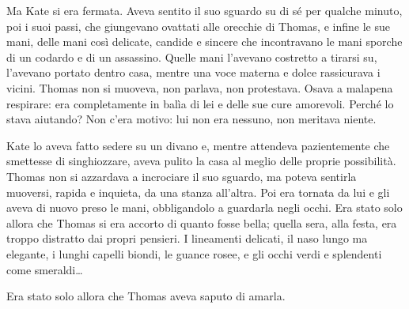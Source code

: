 \documentclass[a4paper,oneside,10pt]{memoir}
\begin{document}
Ma Kate si era fermata. Aveva sentito il suo sguardo su di sé per qualche minuto, poi i suoi passi, che giungevano
ovattati alle orecchie di Thomas, e infine le sue mani, delle mani così delicate, candide e sincere che incontravano
le mani sporche di un codardo e di un assassino. Quelle mani l'avevano costretto a tirarsi su, l'avevano portato dentro
casa, mentre una voce materna e dolce rassicurava i vicini. Thomas non si muoveva, non parlava, non protestava. Osava a
malapena respirare: era completamente in balìa di lei e delle sue cure amorevoli. Perché lo stava aiutando? Non c'era
motivo: lui non era nessuno, non meritava niente.

Kate lo aveva fatto sedere su un divano e, mentre attendeva pazientemente che smettesse di singhiozzare, aveva pulito la
casa al meglio delle proprie possibilità. Thomas non si azzardava a incrociare il suo sguardo, ma poteva sentirla
muoversi, rapida e inquieta, da una stanza all'altra. Poi era tornata da lui e gli aveva di nuovo preso le mani,
obbligandolo a guardarla negli occhi. Era stato solo allora che Thomas si era accorto di quanto fosse bella; quella
sera, alla festa, era troppo distratto dai propri pensieri. I lineamenti delicati, il naso lungo ma elegante, i lunghi
capelli biondi, le guance rosee, e gli occhi verdi e splendenti come smeraldi\dots{}

Era stato solo allora che Thomas aveva saputo di amarla.
\end{document}
